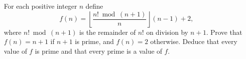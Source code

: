 For each positive integer $n$ define
\[
f(n)=\left\lfloor\dfrac{n!\bmod(n+1)}{n}\right\rfloor(n-1)+2,
\]
where $n!\bmod(n+1)$ is the remainder of $n!$ on division by $n+1$. Prove that $f(n)=n+1$ if $n+1$ is prime, and $f(n)=2$ otherwise. Deduce that every value of $f$ is prime and that every prime is a value of $f$.
